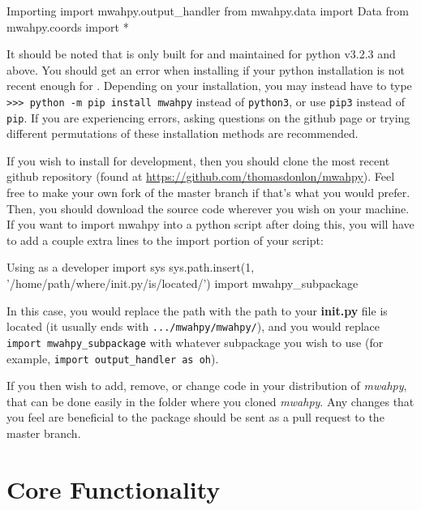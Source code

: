 \documentclass{article}
\begin{document}
\begin{codelisting}{Importing \mwahpy}
import mwahpy.output_handler
from mwahpy.data import Data
from mwahpy.coords import *
\end{codelisting}

It should be noted that \mwahpy is only built for and maintained for python v3.2.3 and above. You should get an error when installing if your python installation is not recent enough for \mwahpy. Depending on your installation, you may instead have to type \verb!>>> python -m pip install mwahpy! instead of \verb!python3!, or use \verb!pip3! instead of \verb!pip!. If you are experiencing errors, asking questions on the \mwahpy github page or trying different permutations of these installation methods are recommended. 

If you wish to install \mwahpy for development, then you should clone the most recent \mwahpy github repository (found at \url{https://github.com/thomasdonlon/mwahpy}). Feel free to make your own fork of the master branch if that's what you would prefer. Then, you should download the source code wherever you wish on your machine. If you want to import mwahpy into a python script after doing this, you will have to add a couple extra lines to the import portion of your script: \\

\begin{codelisting}{Using \mwahpy as a developer}
import sys
sys.path.insert(1, '/home/path/where/init.py/is/located/')
import mwahpy_subpackage
\end{codelisting}

In this case, you would replace the path with the path to your \textbf{init.py} file is located (it usually ends with \verb!.../mwahpy/mwahpy/!), and you would replace \verb!import mwahpy_subpackage! with whatever subpackage you wish to use (for example, \verb!import output_handler as oh!). 

If you then wish to add, remove, or change code in your distribution of \textit{mwahpy}, that can be done easily in the folder where you cloned \textit{mwahpy}. Any changes that you feel are beneficial to the package should be sent as a pull request to the master branch. 

\newpage

\section{Core Functionality} \label{sec:core_functionality}
\end{document}
